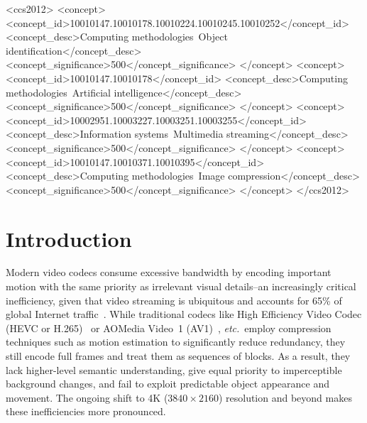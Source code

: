 \documentclass[manuscript, screen]{acmart}
\newcommand{\etc}{\emph{etc.\xspace}}
\newcommand{\vxv}[2]{$#1\!\times\!#2$}
\begin{document}
\begin{CCSXML}
<ccs2012>
    <concept>
        <concept_id>10010147.10010178.10010224.10010245.10010252</concept_id>
        <concept_desc>Computing methodologies~Object identification</concept_desc>
        <concept_significance>500</concept_significance>
        </concept>
    <concept>
        <concept_id>10010147.10010178</concept_id>
        <concept_desc>Computing methodologies~Artificial intelligence</concept_desc>
        <concept_significance>500</concept_significance>
        </concept>
    <concept>
        <concept_id>10002951.10003227.10003251.10003255</concept_id>
        <concept_desc>Information systems~Multimedia streaming</concept_desc>
        <concept_significance>500</concept_significance>
        </concept>
    <concept>
        <concept_id>10010147.10010371.10010395</concept_id>
        <concept_desc>Computing methodologies~Image compression</concept_desc>
        <concept_significance>500</concept_significance>
        </concept>
</ccs2012>
\end{CCSXML}



\maketitle

\section{Introduction}
Modern video codecs consume excessive bandwidth by encoding important motion with the same priority as irrelevant visual details--an increasingly critical inefficiency, given that video streaming is ubiquitous and accounts for 65\% of global Internet traffic~\cite{sandvine}. While traditional codecs like High Efficiency Video Codec (HEVC or H.265)~\cite{h265_overview} or AOMedia Video~1 (AV1)~\cite{av1_overview}, \etc ~employ compression techniques such as motion estimation to significantly reduce redundancy, they still encode full frames and treat them as sequences of blocks. As a result, they lack higher-level semantic understanding, give equal priority to imperceptible background changes, and fail to exploit predictable object appearance and movement. The ongoing shift to 4K (\vxv{3840}{2160}) resolution and beyond makes these inefficiencies more pronounced.
\end{document}
